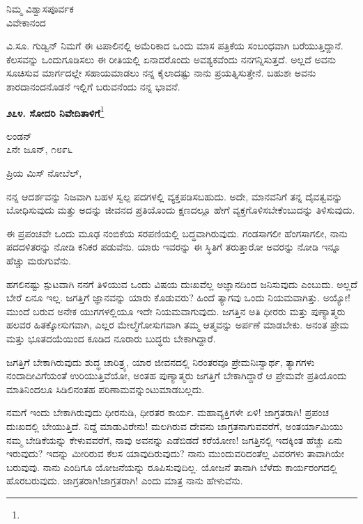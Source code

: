 \begin{flushright}
ನಿಮ್ಮ ವಿಶ್ವಾಸಪೂರ್ವಕ\\ವಿವೇಕಾನಂದ
\end{flushright}

ವಿ.ಸೂ.\enginline{-} ಗುಡ್ವಿನ್ ನಿಮಗೆ ಈ ಟಪಾಲಿನಲ್ಲಿ ಅಮೆರಿಕಾದ ಒಂದು ಮಾಸ ಪತ್ರಿಕೆಯ ಸಂಬಂಧವಾಗಿ ಬರೆಯುತ್ತಿದ್ದಾನೆ. ಕೆಲಸವನ್ನು ಒಂದುಗೂಡಿಸಲು ಈ ರೀತಿಯಲ್ಲಿ ಏನಾದರೊಂದು ಅವಶ್ಯಕವೆಂದು ನನಗನ್ನಿಸುತ್ತದೆ. ಅಲ್ಲದೆ ಅವನು ಸೂಚಿಸುವ ಮಾರ್ಗದಲ್ಲೇ ಸಹಾಯಮಾಡಲು ನನ್ನ ಕೈಲಾದಷ್ಟು ನಾನು ಪ್ರಯತ್ನಿಸುತ್ತೇನೆ. ಬಹುಶಃ ಅವನು ಶಾರದಾ\break ನಂದನೊಡನೆ ಇಲ್ಲಿಗೆ ಬರುವನೆಂದು ನನ್ನ ಭಾವನೆ.

\begin{center}
\textbf{೨೭೪. ಸೋದರಿ ನಿವೇದಿತಾಳಿಗೆ}\footnote{}
\end{center}

\begin{flushright}
ಲಂಡನ್\\೭ನೇ ಜೂನ್, ೧೮೯೬
\end{flushright}

\noindent
ಪ್ರಿಯ ಮಿಸ್ ನೋಬೆಲ್,

ನನ್ನ ಆದರ್ಶವನ್ನು ನಿಜವಾಗಿ ಬಹಳ ಸ್ವಲ್ಪ ಪದಗಳಲ್ಲಿ ವ್ಯಕ್ತಪಡಿಸಬಹುದು. ಅದೇ, ಮಾನವನಿಗೆ ತನ್ನ ದೈವತ್ವವನ್ನು ಬೋಧಿಸುವುದು ಮತ್ತು ಅದನ್ನು ಜೀವನದ ಪ್ರತಿಯೊಂದು ಕ್ಷಣದಲ್ಲೂ ಹೇಗೆ ವ್ಯಕ್ತಗೊಳಿಸಬೇಕೆಂಬುದನ್ನು ತಿಳಿಸುವುದು.
\vspace{0.3cm}

ಈ ಪ್ರಪಂಚವೇ ಒಂದು ಮೂಢ ನಂಬಿಕೆಯ ಸರಪಣಿಯಲ್ಲಿ ಬದ್ಧವಾಗಿರುವುದು. ಗಂಡಸಾಗಲೀ ಹೆಂಗಸಾಗಲೀ, ನಾನು ಪದದಳಿತರನ್ನು ನೋಡಿ ಕನಿಕರ ಪಡುವೆನು. ಯಾರು ಇವರನ್ನು ಈ ಸ್ಥಿತಿಗೆ ತರುತ್ತಾರೋ ಅವರನ್ನು ನೋಡಿ ಇನ್ನೂ ಹೆಚ್ಚು ಮರುಗುವೆನು.
\vspace{0.3cm}

ಹಗಲಿನಷ್ಟು ಸ್ಪುಟವಾಗಿ ನನಗೆ ತಿಳಿಯುವ ಒಂದು ವಿಷಯ ದುಃಖವೆಲ್ಲ ಅಜ್ಞಾನದಿಂದ ಜನಿಸುವುದು ಎಂಬುದು. ಅಲ್ಲದೆ ಬೇರೆ ಏನೂ ಇಲ್ಲ. ಜಗತ್ತಿಗೆ ಜ್ಞಾನವನ್ನು ಯಾರು ಕೊಡುವರು? ಹಿಂದೆ ತ್ಯಾಗವು ಒಂದು ನಿಯಮವಾಗಿತ್ತು. ಅಯ್ಯೋ! ಮುಂದೆ ಬರುವ ಅನೇಕ ಯುಗಗಳಲ್ಲಿಯೂ ಇದೇ ನಿಯಮವಾಗುವುದು. ಜಗತ್ತಿನ ಅತಿ ಧೀರರು ಮತ್ತು ಪುಣ್ಯಾತ್ಮರು ಹಲವರ ಹಿತಕ್ಕೋಸುಗವಾಗಿ, ಎಲ್ಲರ ಮೇಲ್ಮೆಗೋಸುಗವಾಗಿ ತಮ್ಮ ಆತ್ಮವನ್ನು ಅರ್ಪಣೆ ಮಾಡಬೇಕು. ಅನಂತ ಪ್ರೇಮ ಮತ್ತು ಭೂತದಯೆಯಿಂದ ಕೂಡಿದ ನೂರಾರು ಬುದ್ಧರು ಬೇಕಾಗಿದ್ದಾರೆ.
\vspace{0.3cm}

ಜಗತ್ತಿಗೆ ಬೇಕಾಗಿರುವುದು ಶುದ್ಧ ಚಾರಿತ್ರ್ಯ, ಯಾರ ಜೀವನದಲ್ಲಿ ನಿರಂತರವೂ ಪ್ರೇಮನಿಃಸ್ವಾರ್ಥ, ತ್ಯಾಗಗಳು ನಂದಾದೀವಿಗೆಯಂತೆ ಉರಿಯುತ್ತಿವೆಯೋ, ಅಂತಹ ಪುಣ್ಯಾತ್ಮರು ಜಗತ್ತಿಗೆ ಬೇಕಾಗಿದ್ದಾರೆ ಆ ಪ್ರೇಮವೇ ಪ್ರತಿಯೊಂದು ಮಾತಿನಿಂದಲೂ ಸಿಡಿಲಿನಂತಹ ಪರಿಣಾಮವನ್ನುಂಟುಮಾಡಬಲ್ಲದು.

ನಮಗೆ ಇಂದು ಬೇಕಾಗಿರುವುದು ಧೀರನುಡಿ, ಧೀರತರ ಕಾರ್ಯ. ಮಹಾವ್ಯಕ್ತಿಗಳೇ ಏಳಿ! ಜಾಗ್ರತರಾಗಿ! ಪ್ರಪಂಚ ದುಃಖದಲ್ಲಿ ಬೇಯುತ್ತಿದೆ. ನಿದ್ದೆ ಮಾಡುವಿರೇನು! ಮಲಗಿರುವ ದೇವನು ಜಾಗ್ರತನಾಗುವವರೆಗೆ, ಅಂತರ್ಯಾಮಿಯು ನಮ್ಮ ಬೇಡಿಕೆಯನ್ನು ಕೇಳುವವರೆಗೆ, ನಾವು ಅವನನ್ನು ಎಡೆಬಿಡದೆ ಕರೆಯೋಣ! ಜಗತ್ತಿನಲ್ಲಿ ಇದಕ್ಕಿಂತ ಹೆಚ್ಚು ಏನು ಇರುವುದು? ಇದನ್ನು ಮೀರಿರುವ ಕೆಲಸ ಯಾವುದಿರುವುದು? ನಾನು ಮುಂದುವರಿದಂತೆಲ್ಲ ವಿವರಗಳು ತಾವಾಗಿಯೇ ಬರುವುವು. ನಾನು ಎಂದಿಗೂ ಯೋಜನೆಯನ್ನು ರೂಪಿಸುವುದಿಲ್ಲ. ಯೋಜನೆ ತಾನಾಗಿ ಬೆಳೆದು ಕಾರ್ಯರಂಗದಲ್ಲಿ ಹೊರಬರುವುದು. ಜಾಗ್ರತರಾಗಿ!ಜಾಗ್ರತರಾಗಿ! ಎಂದು ಮಾತ್ರ ನಾನು ಹೇಳುವೆನು.

